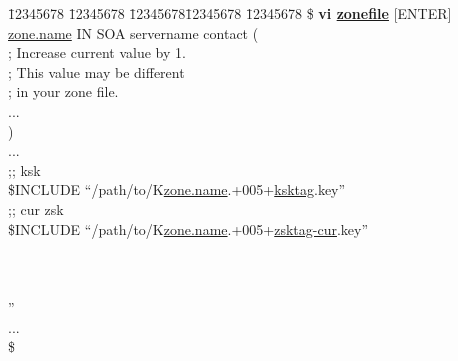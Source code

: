 \begin{tabbing}
\hspace{0.5in} \= 12345678 \= 12345678 \= 12345678\= 12345678 \= 12345678 \kill
\hspace{0.5in}\$ {\bf vi \underline{zonefile}} $[$ENTER$]$ \\
\hspace{0.5in}\underline{zone.name} \> \> \> IN \> SOA \> servername contact (\\
\hspace{3.5in}{\bf 2005092107} ; Increase current value by 1. \\
\hspace{4.4in};  This value may be different \\
\hspace{4.4in}; in your zone file. \\
\hspace{0.5in}\>           \>         ... \\
\hspace{0.5in}\>              ) \\
\hspace{0.5in}... \\
\hspace{0.5in};; ksk \\
\hspace{0.5in}\$INCLUDE ``/path/to/K\underline{zone.name}.+005+\underline{ksktag}.key'' \\
\hspace{0.5in};; cur zsk \\
\hspace{0.5in}\$INCLUDE ``/path/to/K\underline{zone.name}.+005+\underline{zsktag-cur}.key'' \\
 \\
 \\
\hspace{0.5in}{\bf ;; new zsk} \\
'' \\
\hspace{0.5in}... \\
\hspace{0.5in}\$ \\
\end{tabbing}

